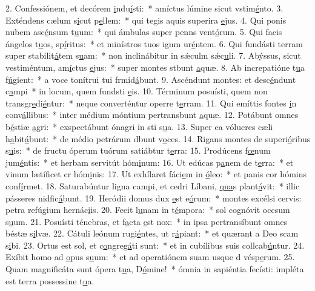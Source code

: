 2. Confessiónem, et decórem \uline{i}ndu\uline{í}sti:~* amíctus lúmine sicut vstim\uline{é}nto.
3. Exténdens cælum s\uline{i}cut p\uline{e}llem:~* qui tegis aquis superira \uline{e}jus.
4. Qui ponis nubem asc\uline{é}nsum t\uline{u}um:~* qui ámbulas super penns vent\uline{ó}rum.
5. Qui facis ángelos t\uline{u}os, sp\uline{í}ritus:~* et minístros tuos ignm ur\uline{é}ntem.
6. Qui fundásti terram super stabilit\uline{á}tem s\uline{u}am:~* non inclinábitur in sǽculm sǽc\uline{u}li.
7. Abýssus, sicut vestiméntum, am\uline{í}ctus \uline{e}jus:~* super montes stbunt \uline{a}quæ.
8. Ab increpatióne t\uline{u}a f\uline{ú}gient:~* a voce tonítrui tui frmid\uline{á}bunt.
9. Ascéndunt montes: et desc\uline{é}ndunt c\uline{a}mpi~* in locum, quem fundsti \uline{e}is.
10. Términum posuísti, quem non transgr\uline{e}di\uline{é}ntur:~* neque converténtur operre t\uline{e}rram.
11. Qui emíttis fontes \uline{i}n conv\uline{á}llibus:~* inter médium móntium pertransbunt \uline{a}quæ.
12. Potábunt omnes b\uline{é}stiæ \uline{a}gri:~* exspectábunt ónagri in sti s\uline{u}a.
13. Super ea vólucres cæli h\uline{a}bit\uline{á}bunt:~* de médio petrárum dbunt v\uline{o}ces.
14. Rigans montes de superi\uline{ó}ribus s\uline{u}is:~* de fructu óperum tuórum satiábtur t\uline{e}rra:
15. Prodúcens f\uline{œ}num jum\uline{é}ntis:~* et herbam servitút hóm\uline{i}num:
16. Ut edúcas p\uline{a}nem de t\uline{e}rra:~* et vinum lætíficet cr hóm\uline{i}nis:
17. Ut exhílaret fáci\uline{e}m in \uline{ó}leo:~* et panis cor hómins conf\uline{í}rmet.
18. Saturabúntur ligna campi, et cedri Líbani, \uline{qua}s plant\uline{á}vit:~* illic pásseres nidfic\uline{á}bunt.
19. Heródii domus dux \uline{e}st e\uline{ó}rum:~* montes excélsi cervis: petra refúgium hernác\uline{i}is.
20. Fecit l\uline{u}nam in t\uline{é}mpora:~* sol cognóvit occsum s\uline{u}um.
21. Posuísti ténebras, et f\uline{a}cta \uline{e}st nox:~* in ipsa pertransíbunt omnes béstæ s\uline{i}lvæ.
22. Cátuli leónum rugi\uline{é}ntes, ut r\uline{á}piant:~* et quærant a Deo scam s\uline{i}bi.
23. Ortus est sol, et c\uline{o}ngreg\uline{á}ti sunt:~* et in cubílibus suis collcab\uline{ú}ntur.
24. Exíbit homo ad \uline{o}pus s\uline{u}um:~* et ad operatiónem suam usque d vésp\uline{e}rum.
25. Quam magnificáta sunt ópera t\uline{u}a, D\uline{ó}mine!~* ómnia in sapiéntia fecísti: impléta est terra possessine t\uline{u}a.

